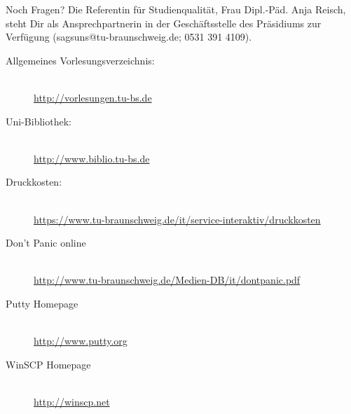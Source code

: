 Noch Fragen? Die Referentin für Studienqualität, Frau Dipl.-Päd. Anja Reisch, steht Dir als Ansprechpartnerin in der Geschäftsstelle des Präsidiums zur Verfügung (sagsuns@tu-braunschweig.de; 0531 391 4109).

\begin{description}
\item[Allgemeines Vorlesungsverzeichnis:] ~\\
{\footnotesize\url{http://vorlesungen.tu-bs.de}}
\item[Uni-Bibliothek:] ~\\
{\footnotesize\url{http://www.biblio.tu-bs.de}}
\item[Druckkosten:] ~\\
{\footnotesize\url{https://www.tu-braunschweig.de/it/service-interaktiv/druckkosten}}
\item[Don't Panic online] ~\\
{\footnotesize\url{http://www.tu-braunschweig.de/Medien-DB/it/dontpanic.pdf}}
\item[Putty Homepage] ~\\
{\footnotesize\url{http://www.putty.org}}
\item[WinSCP Homepage] ~\\
{\footnotesize\url{http://winscp.net}}
\end{description}
